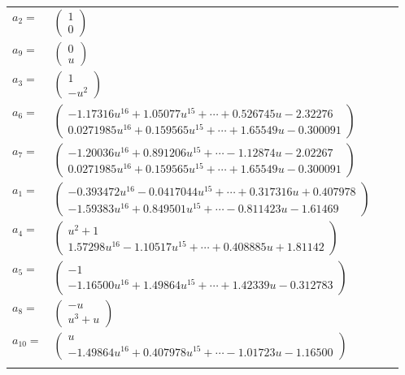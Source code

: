 \documentclass[1p]{elsarticle_modified}
\theoremstyle{definition}
\begin{document}
\begin{tabular}{m{7pt} m{180pt} m{7pt} m{180pt} }
\flushright $a_{2}=$&$\begin{pmatrix}1\\0\end{pmatrix}$ \\
\flushright $a_{9}=$&$\begin{pmatrix}0\\u\end{pmatrix}$ \\
\flushright $a_{3}=$&$\begin{pmatrix}1\\- u^2\end{pmatrix}$ \\
\flushright $a_{6}=$&$\begin{pmatrix}-1.17316 u^{16}+1.05077 u^{15}+\cdots+0.526745 u-2.32276\\0.0271985 u^{16}+0.159565 u^{15}+\cdots+1.65549 u-0.300091\end{pmatrix}$ \\
\flushright $a_{7}=$&$\begin{pmatrix}-1.20036 u^{16}+0.891206 u^{15}+\cdots-1.12874 u-2.02267\\0.0271985 u^{16}+0.159565 u^{15}+\cdots+1.65549 u-0.300091\end{pmatrix}$ \\
\flushright $a_{1}=$&$\begin{pmatrix}-0.393472 u^{16}-0.0417044 u^{15}+\cdots+0.317316 u+0.407978\\-1.59383 u^{16}+0.849501 u^{15}+\cdots-0.811423 u-1.61469\end{pmatrix}$ \\
\flushright $a_{4}=$&$\begin{pmatrix}u^2+1\\1.57298 u^{16}-1.10517 u^{15}+\cdots+0.408885 u+1.81142\end{pmatrix}$ \\
\flushright $a_{5}=$&$\begin{pmatrix}-1\\-1.16500 u^{16}+1.49864 u^{15}+\cdots+1.42339 u-0.312783\end{pmatrix}$ \\
\flushright $a_{8}=$&$\begin{pmatrix}- u\\u^3+u\end{pmatrix}$ \\
\flushright $a_{10}=$&$\begin{pmatrix}u\\-1.49864 u^{16}+0.407978 u^{15}+\cdots-1.01723 u-1.16500\end{pmatrix}$\\&\end{tabular}
\end{document}
